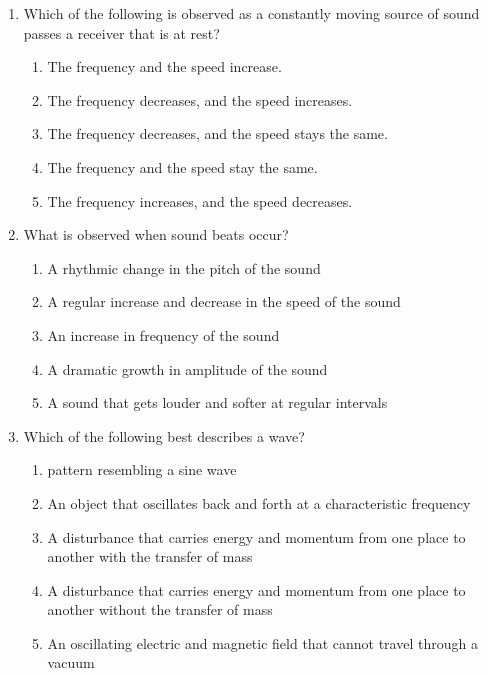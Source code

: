 \documentclass{../../../oss-classkick}
\begin{document}
\begin{multicols}{2}
\begin{enumerate}[leftmargin=18pt,resume]
  \item Which of the following is observed as a constantly moving source of
    sound passes a receiver that is at rest?
    \begin{enumerate}[nosep,leftmargin=18pt,label=(\Alph*)]
    \item The frequency and the speed increase.
    \item The frequency decreases, and the speed increases.
    \item The frequency decreases, and the speed stays the same.
    \item The frequency and the speed stay the same.
    \item The frequency increases, and the speed decreases.
    \end{enumerate}
    \vspace{.7in}
    
  \item What is observed when sound beats occur?
    \begin{enumerate}[nosep,leftmargin=18pt,label=(\Alph*)]
    \item A rhythmic change in the pitch of the sound
    \item A regular increase and decrease in the speed of the sound
    \item An increase in frequency of the sound
    \item A dramatic growth in amplitude of the sound
    \item A sound that gets louder and softer at regular intervals
    \end{enumerate}
    \vspace{.7in}
    \columnbreak
    
  \item Which of the following best describes a wave?
    \begin{enumerate}[nosep,leftmargin=18pt,label=(\Alph*)]
    \item pattern resembling a sine wave
    \item An object that oscillates back and forth at a characteristic frequency
    \item A disturbance that carries energy and momentum from one place to
      another with the transfer of mass
    \item A disturbance that carries energy and momentum from one place to
      another without the transfer of mass
    \item An oscillating electric and magnetic field that cannot travel through
      a vacuum
    \end{enumerate}
    \vspace{.7in}
    

\end{enumerate}
\end{multicols}
\end{document}

